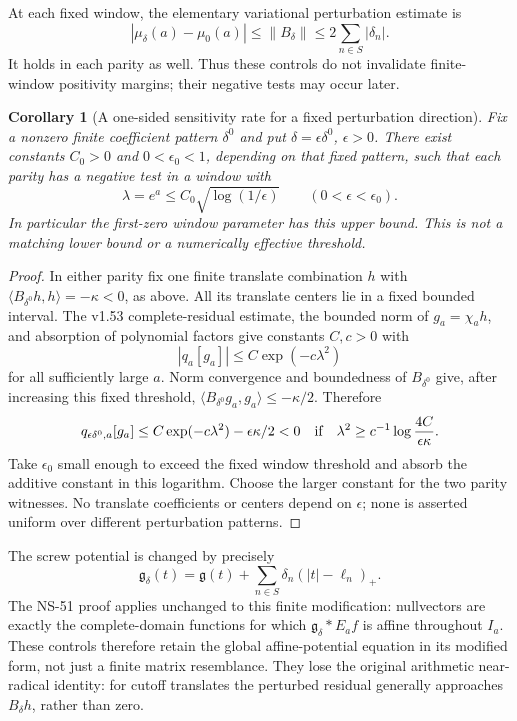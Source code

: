 \documentclass[11pt]{article}
\newtheorem{corollary}[theorem]{Corollary}
\newcommand{\norm}[1]{\left\|#1\right\|}
\begin{document}
At each fixed window, the elementary variational perturbation estimate is
\[
 |\mu_\delta(a)-\mu_0(a)|\le\norm{B_\delta}
                    \le2\sum_{n\in S}|\delta_n|.
\]
It holds in each parity as well. Thus these controls do not invalidate
finite-window positivity margins; their negative tests may occur later.

\begin{corollary}[A one-sided sensitivity rate for a fixed perturbation direction]
Fix a nonzero finite coefficient pattern $\delta^0$ and put
$\delta=\epsilon\delta^0$, $\epsilon>0$. There exist constants
$C_0>0$ and $0<\epsilon_0<1$, depending on that fixed pattern, such
that each parity has a negative test in a window with
\[
 \lambda=e^a\le C_0\sqrt{\log(1/\epsilon)}
       \qquad(0<\epsilon<\epsilon_0).
\]
In particular the first-zero window parameter has this upper bound.
This is not a matching lower bound or a numerically effective threshold.
\end{corollary}
\begin{proof}
In either parity fix one finite translate combination $h$ with
$\langle B_{\delta^0}h,h\rangle=-\kappa<0$, as above.
All its translate centers lie in a fixed bounded interval. The
v1.53 complete-residual estimate, the bounded norm of $g_a=\chi_a h$,
and absorption of polynomial factors give constants $C,c>0$ with
\[
 |q_a[g_a]|\le C\exp(-c\lambda^2)
\]
for all sufficiently large $a$. Norm convergence and boundedness of
$B_{\delta^0}$ give, after increasing this fixed threshold,
$\langle B_{\delta^0}g_a,g_a\rangle\le-\kappa/2$.
Therefore
\[
 q_{\epsilon\delta^0,a}[g_a]
 \le C\exp(-c\lambda^2)-\epsilon\kappa/2<0
 \quad\hbox{if}\quad
 \lambda^2\ge c^{-1}\log\frac{4C}{\epsilon\kappa}.
\]
Take $\epsilon_0$ small enough to exceed the fixed window threshold
and absorb the additive constant in this logarithm. Choose the larger
constant for the two parity witnesses. No translate coefficients or
centers depend on $\epsilon$; none is asserted uniform over different
perturbation patterns.
\end{proof}

The screw potential is changed by precisely
\[
 \mathfrak g_\delta(t)=\mathfrak g(t)+
                 \sum_{n\in S}\delta_n(|t|-\ell_n)_+.
\]
The NS-51 proof applies unchanged to this finite modification:
nullvectors are exactly the complete-domain functions for which
$\mathfrak g_\delta*E_af$ is affine throughout $I_a$.
These controls therefore retain the global affine-potential equation
in its modified form, not just a finite matrix resemblance.
They lose the original arithmetic near-radical identity:
for cutoff translates the perturbed residual generally approaches
$B_\delta h$, rather than zero.
\end{document}
